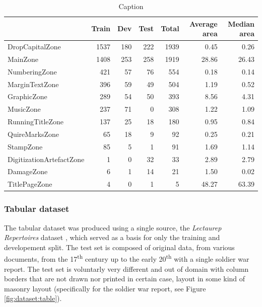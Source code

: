 \documentclass{jdmdh}
\begin{document}
\begin{table}[ht]
    \centering
    \begin{tabular}{l|rrr|r|rr}
    \hline
                              &   Train &   Dev &   Test &   Total &   Average area &   Median area \\
    \hline
     DropCapitalZone          &    1537 &   180 &    222 &    1939 &           0.45 &          0.26 \\
     MainZone                 &    1408 &   253 &    258 &    1919 &          28.86 &         26.43 \\
     NumberingZone            &     421 &    57 &     76 &     554 &           0.18 &          0.14 \\
     MarginTextZone           &     396 &    59 &     49 &     504 &           1.19 &          0.52 \\
     GraphicZone              &     289 &    54 &     50 &     393 &           8.56 &          4.31 \\
     MusicZone                &     237 &    71 &      0 &     308 &           1.22 &          1.09 \\
     RunningTitleZone         &     137 &    25 &     18 &     180 &           0.95 &          0.84 \\
     QuireMarksZone           &      65 &    18 &      9 &      92 &           0.25 &          0.21 \\
     StampZone                &      85 &     5 &      1 &      91 &           1.69 &          1.14 \\
     DigitizationArtefactZone &       1 &     0 &     32 &      33 &           2.89 &          2.79 \\
     DamageZone               &       6 &     1 &     14 &      21 &           1.50 &          0.02 \\
     TitlePageZone            &       4 &     0 &      1 &       5 &          48.27 &         63.39 \\
    \hline
    \end{tabular}
    \caption{Caption}
    \label{tab:comp:segmonto}
\end{table}

\subsubsection{Tabular dataset}
\label{subsubsection:tabulardataset}

The tabular dataset was produced using a single source, the \textit{Lectaurep Repertoires} dataset \citep{p2021notaires}, which served as a basis for only the training and developement split. The test set is composed of original data, from various documents, from the 17\textsuperscript{th} century up to the early 20\textsuperscript{th} with a single soldier war report. The test set is voluntarly very different and out of domain with column borders that are not drawn nor printed in certain case, layout in some kind of masonry layout (specifically for the soldier war report, see Figure \ref{fig:dataset:table}).
\end{document}
